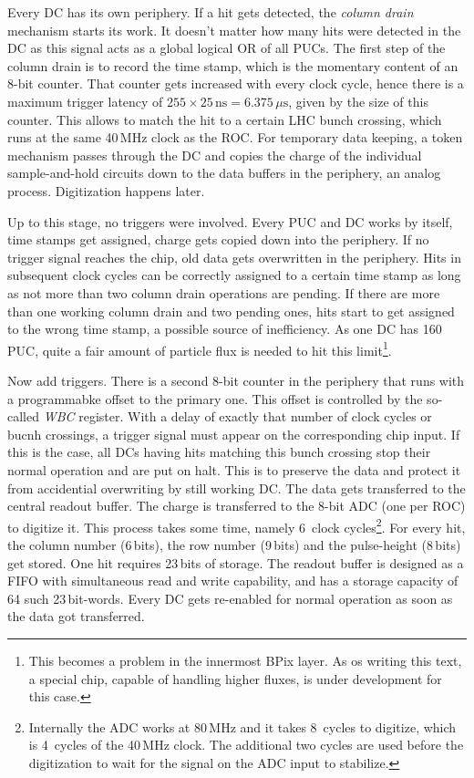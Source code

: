 Every \gls{DC} has its own periphery. If a hit gets detected, the \emph{column drain} mechanism starts its work. It doesn't matter how many hits were detected in the \gls{DC} as this signal acts as a global logical OR of all \glspl{PUC}. The first step of the column drain is to record the time stamp, which is the momentary content of an 8-bit counter. That counter gets increased with every clock cycle, hence there is a maximum trigger latency of $255\times25\,\text{ns}=6.375\,\mu\text{s}$, given by the size of this counter. This allows to match the hit to a certain LHC bunch crossing, which runs at the same 40\,MHz clock as the \gls{ROC}. For temporary data keeping, a token mechanism passes through the \gls{DC} and copies the charge of the individual sample-and-hold circuits down to the data buffers in the periphery, an analog process. Digitization happens later.

Up to this stage, no triggers were involved. Every \gls{PUC} and \gls{DC} works by itself, time stamps get assigned, charge gets copied down into the periphery. If no trigger signal reaches the chip, old data gets overwritten in the periphery. Hits in subsequent clock cycles can be correctly assigned to a certain time stamp as long as not more than two column drain operations are pending. If there are more than one working column drain and two pending ones, hits start to get assigned to the wrong time stamp, a possible source of inefficiency. As one \gls{DC} has 160\,\gls{PUC}, quite a fair amount of particle flux is needed to hit this limit\footnote{This becomes a problem in the innermost BPix layer. As os writing this text, a special chip, capable of handling higher fluxes, is under development for this case.}.

Now add triggers. There is a second 8-bit counter in the periphery that runs with a programmabke offset to the primary one. This offset is controlled by the so-called \emph{WBC} register. With a delay of exactly that number of clock cycles or bucnh crossings, a trigger signal must appear on the corresponding chip input. If this is the case, all \glspl{DC} having hits matching this bunch crossing stop their normal operation and are put on halt. This is to preserve the data and protect it from accidential overwriting by still working \gls{DC}. The data gets transferred to the central readout buffer.  The charge is transferred to the 8-bit ADC (one per \gls{ROC}) to digitize it. This process takes some time, namely 6~clock cycles\footnote{Internally the ADC works at 80\,MHz and it takes 8~cycles to digitize, which is 4~cycles of the 40\,MHz clock. The additional two cycles are used before the digitization to wait for the signal on the ADC input to stabilize.}. For every hit, the column number (6\,bits), the row number (9\,bits) and the pulse-height (8\,bits) get stored. One hit requires 23\,bits of storage. The readout buffer is designed as a FIFO with simultaneous read and write capability, and has a storage capacity of 64 such 23\,bit-words. Every \gls{DC} gets re-enabled for normal operation as soon as the data got transferred.

